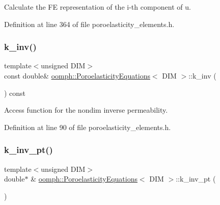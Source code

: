 Calculate the FE representation of the i-\/th component of u. 



Definition at line 364 of file poroelasticity\+\_\+elements.\+h.

\mbox{\label{classoomph_1_1PoroelasticityEquations_a2543a15dbefd2062f591e8257ac534b8}} 
\subsubsection{\texorpdfstring{k\+\_\+inv()}{k\_inv()}}
{\footnotesize\ttfamily template$<$unsigned D\+IM$>$ \\
const double\& \hyperlink{classoomph_1_1PoroelasticityEquations}{oomph\+::\+Poroelasticity\+Equations}$<$ D\+IM $>$\+::k\+\_\+inv (\begin{DoxyParamCaption}{ }\end{DoxyParamCaption}) const\hspace{0.3cm}{\ttfamily [inline]}}



Access function for the nondim inverse permeability. 



Definition at line 90 of file poroelasticity\+\_\+elements.\+h.

\mbox{\label{classoomph_1_1PoroelasticityEquations_a505c5b6b28d5e9f644533491a3231ffb}} 
\subsubsection{\texorpdfstring{k\+\_\+inv\+\_\+pt()}{k\_inv\_pt()}}
{\footnotesize\ttfamily template$<$unsigned D\+IM$>$ \\
double$\ast$ \& \hyperlink{classoomph_1_1PoroelasticityEquations}{oomph\+::\+Poroelasticity\+Equations}$<$ D\+IM $>$\+::k\+\_\+inv\+\_\+pt (\begin{DoxyParamCaption}{ }\end{DoxyParamCaption})\hspace{0.3cm}{\ttfamily [inline]}}



